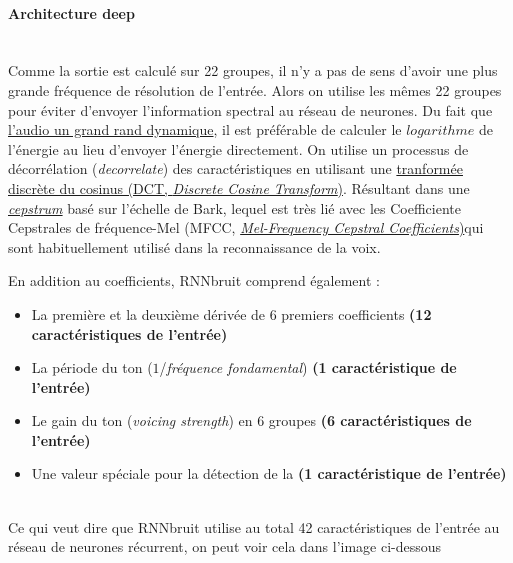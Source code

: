 \documentclass[conference,onecolumn]{IEEEtran}
\begin{document}
\medskip
\paragraph{\textbf{Architecture deep}}
\hfill\\
Comme la sortie est calculé sur 22 groupes, il n’y a pas de sens d’avoir une plus grande fréquence de résolution de l’entrée. Alors on utilise les mêmes 22 groupes pour éviter d’envoyer l’information spectral au réseau de neurones. Du fait que \href{https://www.britannica.com/science/dynamic-range}{l’audio un grand rand dynamique}, il est préférable de calculer le $logarithme$ de l’énergie au lieu d’envoyer l’énergie directement. On utilise un processus de décorrélation (\textit{decorrelate}) des caractéristiques en utilisant une \href{https://dsp.stackexchange.com/questions/27810/how-to-understand-the-de-correlation-property-of-dct-what-does-de-correlation-m}{tranformée discrète du cosinus (DCT, \textit{Discrete Cosine Transform})}. Résultant dans une \href{https://es.wikipedia.org/wiki/Cepstrum}{\textit{cepstrum}} basé sur l’échelle de Bark, lequel est très lié avec les Coefficiente Cepstrales de fréquence-Mel (MFCC, \href{https://en.wikipedia.org/wiki/Mel-frequency_cepstrum}{\textit{Mel-Frequency Cepstral Coefficients})}qui sont habituellement utilisé dans la reconnaissance de la voix.

En addition au coefficients, RNNbruit comprend également :

\begin{itemize}
    \item La première et la deuxième dérivée de 6 premiers coefficients  \textbf{(12 caractéristiques de l’entrée)}
    \item La période du ton ($1$/\textit{fréquence fondamental}) \textbf{(1 caractéristique de l’entrée)}
    \item Le gain du ton  (\textit{voicing strength}) en 6 groupes \textbf{(6 caractéristiques de l’entrée)}
    \item Une valeur spéciale pour la détection de la \textbf{(1 caractéristique de l’entrée)}
\end{itemize}

\hfill\\
Ce qui veut dire que RNNbruit utilise au total 42 caractéristiques de l’entrée au réseau de neurones récurrent, on peut voir cela dans l’image ci-dessous
\end{document}
